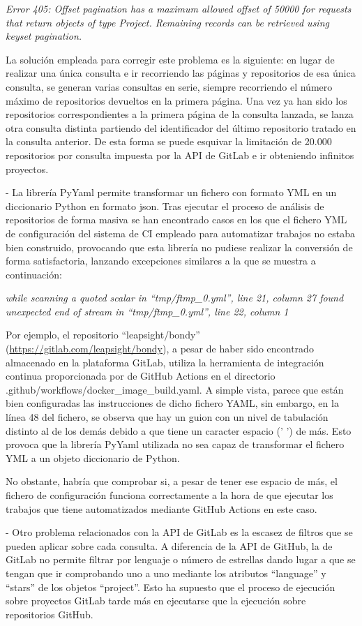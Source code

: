 \textit{Error 405: Offset pagination has a maximum allowed offset of 50000 for requests that return objects of type Project. Remaining records can be retrieved using keyset pagination.}

La solución empleada para corregir este problema es la siguiente: en lugar de realizar una única consulta e ir recorriendo las páginas y repositorios de esa única consulta, se generan varias consultas en serie, siempre recorriendo el número máximo de repositorios devueltos en la primera página. Una vez ya han sido los repositorios correspondientes a la primera página de la consulta lanzada, se lanza otra consulta distinta partiendo del identificador del último repositorio tratado en la consulta anterior. De esta forma se puede esquivar la limitación de 20.000 repositorios por consulta impuesta por la API de GitLab e ir obteniendo infinitos proyectos.

- La librería PyYaml permite transformar un fichero con formato YML en un diccionario Python en formato json. Tras ejecutar el proceso de análisis de repositorios de forma masiva se han encontrado casos en los que el fichero YML de configuración del sistema de CI empleado para automatizar trabajos no estaba bien construido, provocando que esta librería no pudiese realizar la conversión de forma satisfactoria, lanzando excepciones similares a la que se muestra a continuación:

\textit{while scanning a quoted scalar in ``tmp/ftmp\_0.yml'', line 21, column 27 found unexpected end of stream in ``tmp/ftmp\_0.yml'', line 22, column 1}

Por ejemplo, el repositorio ``leapsight/bondy'' (\url{https://gitlab.com/leapsight/bondy}), a pesar de haber sido encontrado almacenado en la plataforma GitLab, utiliza la herramienta de integración continua proporcionada por de GitHub Actions en el directorio .github/workflows/docker\_image\_build.yaml. A simple vista, parece que están bien configuradas las instrucciones de dicho fichero YAML, sin embargo, en la línea 48 del fichero, se observa que hay un guion con un nivel de tabulación distinto al de los demás debido a que tiene un caracter espacio (' ') de más. Esto provoca que la librería PyYaml utilizada no sea capaz de transformar el fichero YML a un objeto diccionario de Python. 

No obstante, habría que comprobar si, a pesar de tener ese espacio de más, el fichero de configuración funciona correctamente a la hora de que ejecutar los trabajos que tiene automatizados mediante GitHub Actions en este caso.

- Otro problema relacionados con la API de GitLab es la escasez de filtros que se pueden aplicar sobre cada consulta. A diferencia de la API de GitHub, la de GitLab no permite filtrar por lenguaje o número de estrellas dando lugar a que se tengan que ir comprobando uno a uno mediante los atributos ``language'' y ``stars'' de los objetos ``project''. Esto ha supuesto que el proceso de ejecución sobre proyectos GitLab tarde más en ejecutarse que la ejecución sobre repositorios GitHub.